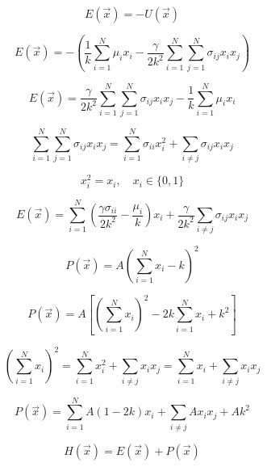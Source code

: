\begin{equation}
    E(\vec{x}) = -U(\vec{x})
\end{equation}

\begin{equation}
    E(\vec{x}) = -\left( \frac{1}{k} \sum_{i=1}^N \mu_i x_i - \frac{\gamma}{2k^2} \sum_{i=1}^N \sum_{j=1}^N \sigma_{ij} x_i x_j \right)
\end{equation}

\begin{equation}
    E(\vec{x}) = \frac{\gamma}{2k^2} \sum_{i=1}^N \sum_{j=1}^N \sigma_{ij} x_i x_j - \frac{1}{k} \sum_{i=1}^N \mu_i x_i
\end{equation}

\begin{equation}
    \sum_{i=1}^N \sum_{j=1}^N \sigma_{ij} x_i x_j = \sum_{i=1}^N \sigma_{ii} x_i^2 + \sum_{i \ne j} \sigma_{ij} x_i x_j
\end{equation}

\begin{equation}
    x_i^2 = x_i, \quad x_i \in \{0, 1\}
\end{equation}

\begin{equation}
    E(\vec{x}) = \sum_{i=1}^N \left( \frac{\gamma \sigma_{ii}}{2k^2} - \frac{\mu_i}{k} \right) x_i + \frac{\gamma}{2k^2} \sum_{i \ne j} \sigma_{ij} x_i x_j
\end{equation}

\begin{equation}
    P(\vec{x}) = A \left( \sum_{i=1}^N x_i - k \right)^2
\end{equation}

\begin{equation}
    P(\vec{x}) = A \left[ \left( \sum_{i=1}^N x_i \right)^2 - 2k \sum_{i=1}^N x_i + k^2 \right]
\end{equation}

\begin{equation}
    \left( \sum_{i=1}^N x_i \right)^2 = \sum_{i=1}^N x_i^2 + \sum_{i \ne j} x_i x_j = \sum_{i=1}^N x_i + \sum_{i \ne j} x_i x_j
\end{equation}

\begin{equation}
    P(\vec{x}) = \sum_{i=1}^N A(1 - 2k) x_i + \sum_{i \ne j} A x_i x_j + Ak^2
\end{equation}

\begin{equation}
    H(\vec{x}) = E(\vec{x}) + P(\vec{x})
\end{equation}

